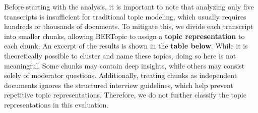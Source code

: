 \documentclass[
  letterpaper,
  DIV=11,
  numbers=noendperiod]{scrartcl}
\begin{document}
Before starting with the analysis, it is important to note that
analyzing only five transcripts is insufficient for traditional topic
modeling, which usually requires hundreds or thousands of documents. To
mitigate this, we divide each transcript into smaller chunks, allowing
BERTopic to assign a \textbf{topic representation} to each chunk. An
excerpt of the results is shown in the \textbf{table below}. While it is
theoretically possible to cluster and name these topics, doing so here
is not meaningful. Some chunks may contain deep insights, while others
may consist solely of moderator questions. Additionally, treating chunks
as independent documents ignores the structured interview guidelines,
which help prevent repetitive topic representations. Therefore, we do
not further classify the topic representations in this evaluation.
\end{document}
